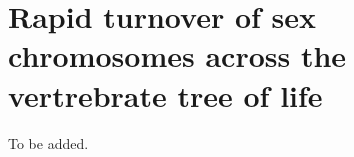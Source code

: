 \chapter{Rapid turnover of sex chromosomes across the vertrebrate tree of life}
\label{chap:sexchrom}

\noindent To be added.

